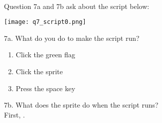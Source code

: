 \noindent \dotfill \\
Question 7a and 7b ask about the script below:
\begin{center}
\texttt{[image: q7\_script0.png]}
\end{center}

\noindent 7a. What do you do to make the script run?
\renewcommand{\theenumi}{\Alph{enumi}}
\begin{enumerate}
\item Click the green flag
\item Click the sprite
\item Press the space key \\
\end{enumerate}

\noindent 7b. What does the sprite do when the script runs? \\

\noindent First, \hrulefill . \\ \\



